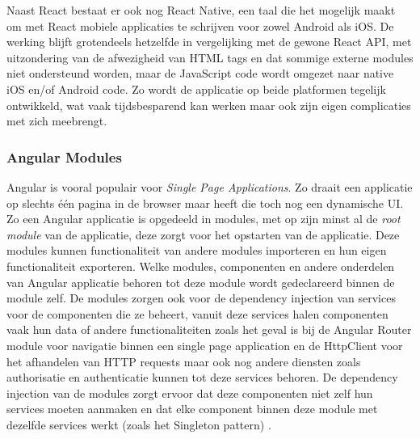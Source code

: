 Naast React bestaat er ook nog React Native, een taal die het mogelijk maakt om met React mobiele applicaties te schrijven voor zowel Android als iOS. De werking blijft grotendeels hetzelfde in vergelijking met de gewone React API, met uitzondering van de afwezigheid van HTML tags en dat sommige externe modules niet ondersteund worden, maar de JavaScript code wordt omgezet naar native iOS en/of Android code. Zo wordt de applicatie op beide platformen tegelijk ontwikkeld, wat vaak tijdsbesparend kan werken maar ook zijn eigen complicaties met zich meebrengt.

\subsubsection{Angular Modules}
Angular is vooral populair voor \textit{Single Page Applications}. Zo draait een applicatie op slechts één pagina in de browser maar heeft die toch nog een dynamische UI. Zo een Angular applicatie is opgedeeld in modules, met op zijn minst al de \textit{root module} van de applicatie, deze zorgt voor het opstarten van de applicatie. Deze modules kunnen functionaliteit van andere modules importeren en hun eigen functionaliteit exporteren. Welke modules, componenten en andere onderdelen van Angular applicatie behoren tot deze module wordt gedeclareerd binnen de module zelf. De modules zorgen ook voor de dependency injection van services voor de componenten die ze beheert, vanuit deze services halen componenten vaak hun data of andere functionaliteiten zoals het geval is bij de Angular Router module voor navigatie binnen een single page application en de HttpClient voor het afhandelen van HTTP requests maar ook nog andere diensten zoals authorisatie en authenticatie kunnen tot deze services behoren. De dependency injection van de modules zorgt ervoor dat deze componenten niet zelf hun services moeten aanmaken en dat elke component binnen deze module met dezelfde services werkt (zoals het Singleton pattern) \autocite{Gechev2017}. 

